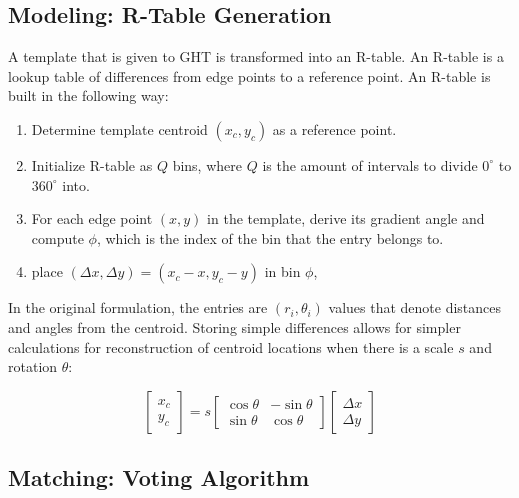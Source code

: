 \documentclass{article}
\begin{document}
\begin{multicols}{3}
\subsection{Modeling: R-Table Generation}

A template that is given to GHT is transformed into an R-table. An R-table is a lookup table of differences from edge points to a reference point. An R-table is built in the following way:

\begin{enumerate}
\itemsep0em
\item Determine template centroid $(x_c, y_c)$ as a reference point.
\item Initialize R-table as $Q$ bins, where $Q$ is the amount of intervals to divide $0^{\circ}$ to $360^{\circ}$ into.
\item For each edge point $(x, y)$ in the template, derive its gradient angle and compute $\phi$, which is the index of the bin that the entry belongs to.
\item place $(\Delta x, \Delta y) = (x_c-x,y_c-y)$ in bin $\phi$,
\end{enumerate}

In the original formulation, the entries are $(r_i, \theta_i)$ values that denote distances and angles from the centroid. Storing simple differences allows for simpler calculations for reconstruction of centroid locations when there is a scale $s$ and rotation $\theta$:

$$
\left[\begin{matrix}x_c \\ y_c \end{matrix}\right] = s \left[\begin{matrix}\cos\theta & -\sin\theta \\ \sin\theta & \cos\theta \end{matrix}\right] \left[\begin{matrix} \Delta x \\ \Delta y\end{matrix}\right]
$$

\subsection{Matching: Voting Algorithm}


\end{multicols}
\end{document}
